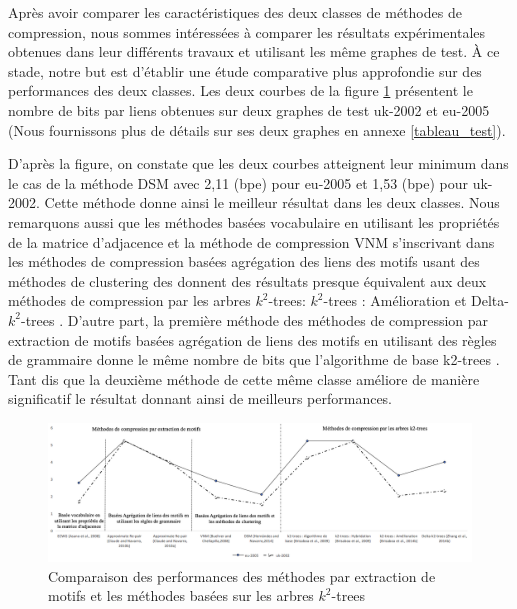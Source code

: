 				
				
				Après avoir comparer les caractéristiques des deux classes de méthodes de compression, nous sommes intéressées à comparer les résultats expérimentales obtenues dans leur différents travaux et utilisant les même graphes de test. À ce stade, notre but est d'établir une étude comparative plus approfondie sur des performances des deux classes. Les deux courbes de la figure \ref{comparaisonVo} présentent le nombre de bits par liens obtenues sur deux graphes de test uk-2002 et eu-2005 (Nous fournissons plus de détails sur ses deux graphes en annexe \ref{tableau_test}).
				
				D'après la figure, on constate que les deux courbes atteignent leur minimum dans le cas de la méthode DSM \citep{hernandez2014compressed} avec 2,11 (bpe) pour eu-2005 et 1,53 (bpe) pour uk-2002. Cette méthode donne ainsi le meilleur résultat dans les deux classes. 	
				Nous remarquons aussi que les méthodes basées vocabulaire en utilisant les propriétés de la matrice d'adjacence et la méthode de compression VNM \citep{buehrer2008scalable} s'inscrivant dans les méthodes de compression basées agrégation des liens des motifs usant des méthodes de clustering des donnent des résultats presque équivalent aux deux méthodes de compression par les arbres $k^2$-trees: $k^2$-trees : Amélioration \citep{brisaboa2014compact} et Delta-$k^2$-trees  \citep{zhang2014delta}. D'autre part, la première méthode \citep{claude2010fast} des méthodes de compression par extraction de motifs  basées agrégation de liens des motifs en utilisant des règles de grammaire donne le même nombre de bits que l'algorithme de base k2-trees \citep{brisaboa2009k}. Tant dis que la deuxième méthode \citep{claude2010extended} de cette même classe améliore de manière significatif le résultat donnant ainsi de meilleurs performances.

\begin{figure}[H]	
				\centering						
				\includegraphics[scale=0.38]{ressources/image/globale.png} 
					\centering
					\caption{Comparaison des performances des méthodes par extraction de motifs et les méthodes basées sur les arbres $k^2$-trees }
					\label{comparaisonVo}
				\end{figure}				
				
